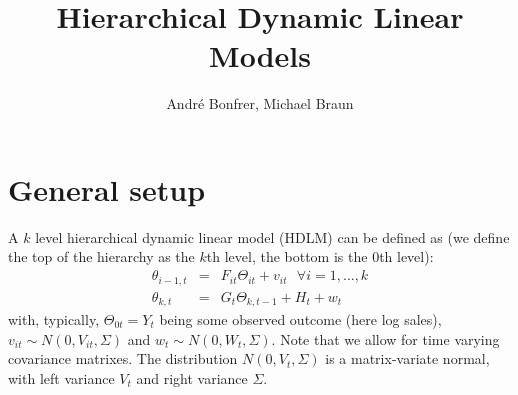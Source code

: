 \documentclass[11pt]{article} %
\title{Hierarchical Dynamic Linear Models}
\author{Andr\'e Bonfrer, Michael Braun}
\begin{document}
\maketitle

\section{General setup}

A $k$ level hierarchical dynamic linear model (HDLM) can be defined as (we define the top of the
hierarchy as the $k$th level, the bottom is the $0$th level):
\begin{eqnarray}
\theta_{i-1,t} & = & F_{it}\Theta_{it} + v_{it} ~~~ \forall i = 1,\ldots, k \\
\theta_{k,t} & = & G_t \Theta_{k,t-1} + H_t + w_t 
\end{eqnarray}
with, typically, $\Theta_{0t} = Y_t$ being some observed outcome (here log sales),
$v_{it} \sim N(0,V_{it},\Sigma)$ and $w_t \sim N(0,W_t,\Sigma)$.  Note that we allow for
time varying covariance matrixes.  The distribution
$N(0,V_t,\Sigma)$ is a matrix-variate normal, with left variance $V_t$ and right variance $\Sigma$. 
\end{document}

